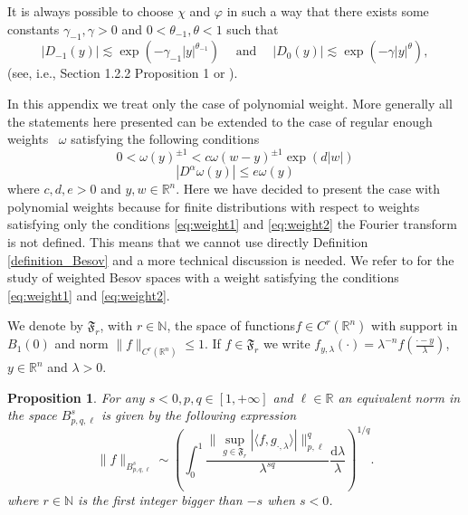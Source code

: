 \documentclass[a4paper,10pt]{article}
\newcommand{\mathd}{\mathrm{d}}
\newcommand{\tmop}[1]{\ensuremath{\operatorname{#1}}}
\newtheorem{proposition}[theorem]{Proposition}
{\theorembodyfont{\rmfamily}\newtheorem{remark}[theorem]{Remark}}
\begin{document}
\begin{remark}
  \label{remark_decay}It is always possible to choose $\chi$ and $\varphi$ in
  such a way that there exists some constants $\gamma_{- 1}, \gamma > 0$ and
  $0 < \theta_{- 1}, \theta < 1$ such that
  \[ | D_{- 1} (y) | \lesssim \exp (- \gamma_{- 1} | y |^{\theta_{- 1}})
     \quad \tmop{and} \quad | D_0 (y) | \lesssim \exp (- \gamma | y
     |^{\theta}), \]
  (see, i.e., {\cite{SchmeisserTriebel}} Section 1.2.2 Proposition 1 or
  {\cite{MW17}}).
\end{remark}

\begin{remark}
  \label{remark_weight}In this appendix we treat only the case of polynomial
  weight. More generally all the statements here presented can be extended to
  the case of regular enough weights \ $\omega$ satisfying the following
  conditions
  \begin{equation}
    0 < \omega (y)^{\pm 1} < c \omega (w - y)^{\pm 1} \exp (d | w |)
    \label{eq:weight1}
  \end{equation}
  \begin{equation}
    | D^{\alpha} \omega (y) | \leqslant e \omega (y) \label{eq:weight2}
  \end{equation}
  where $c, d, e > 0$ and $y, w \in \mathbb{R}^n$. Here we have decided to
  present the case with polynomial weights because for finite distributions
  with respect to weights satisfying only the conditions {\eqref{eq:weight1}}
  and {\eqref{eq:weight2}} the Fourier transform is not defined. This means
  that we cannot use directly Definition \ref{definition_Besov} and a more
  technical discussion is needed. We refer to {\cite{Schott1,Schott2}} for the
  study of weighted Besov spaces with a weight satisfying the conditions
  {\eqref{eq:weight1}} and {\eqref{eq:weight2}}.
\end{remark}

We denote by $\mathfrak{F}_r$, with $r \in \mathbb{N}$, the space of
functions$f \in C^r (\mathbb{R}^n)$ with support in $B_1 (0)$ and norm $\| f
\|_{ C^r (\mathbb{R}^n)} \leq 1$. If $f \in \mathfrak{F}_r$ we
write $f_{y, \lambda} (\cdot) = \lambda^{- n} f \left( \frac{\cdot -
y}{\lambda} \right)$, $y \in \mathbb{R}^n$ and $\lambda > 0$. \

\begin{proposition}
  \label{proposition_equivalentnorm}For any $s < 0, p, q \in [1, + \infty]$
  and $\ell \in \mathbb{R}$ an equivalent norm in the space $B^s_{p, q, \ell}$
  is given by the following expression
  \begin{equation}
    \| f \|_{B^s_{p, q, \ell}} \sim \left( \int_0^1 \frac{\| \sup_{g \in
    \mathfrak{F}_r} | \langle f, g_{\cdot, \lambda} \rangle | \|_{p,
    \ell}^q}{\lambda^{s q}} \frac{\mathd \lambda}{\lambda} \right)^{1 / q} .
    \label{eq:equivalentnorm}
  \end{equation}
  where $r \in \mathbb{N}$ is the first integer bigger than $- s$ when $s <
  0$.
\end{proposition}
\end{document}
